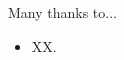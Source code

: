 \thispagestyle{empty}
\label{cha:acknowledgements}

Many thanks to...
\begin{itemize}[label={...}]
    \item XX.
\end{itemize}
